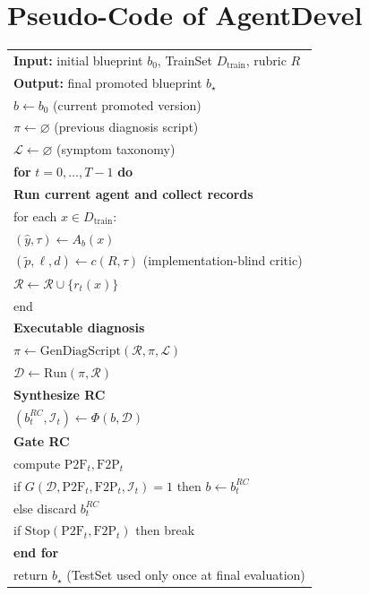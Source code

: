 \documentclass[11pt]{article}
\begin{document}
\clearpage
\onecolumn
\section{Pseudo-Code of AgentDevel}
\begin{tcolorbox}[enhanced, breakable, colback=white, colframe=black!60, title=Algorithm 1: AgentDevel (release-engineering improvement)]
\small
\begin{longtable}{@{}l@{}}

\textbf{Input:} initial blueprint $b_0$, TrainSet $D_{\text{train}}$, rubric $R$\\
\textbf{Output:} final promoted blueprint $b_\star$\\[4pt]

$b \leftarrow b_0$ \hfill (current promoted version)\\
$\pi \leftarrow \varnothing$ \hfill (previous diagnosis script)\\
$\mathcal{L} \leftarrow \varnothing$ \hfill (symptom taxonomy)\\[4pt]

\textbf{for} $t=0,\dots,T-1$ \textbf{do}\\
\quad \textbf{Run current agent and collect records}\\
\quad for each $x\in D_{\text{train}}$:\\
\quad\quad $(\hat y,\tau)\leftarrow A_b(x)$\\
\quad\quad $(\tilde p,\ell,d)\leftarrow c(R,\tau)$ \hfill (implementation-blind critic)\\
\quad\quad $\mathcal{R}\leftarrow \mathcal{R}\cup\{r_t(x)\}$\\
\quad end\\[2pt]

\quad \textbf{Executable diagnosis}\\
\quad $\pi \leftarrow \mathrm{GenDiagScript}(\mathcal{R},\pi,\mathcal{L})$\\
\quad $\mathcal{D}\leftarrow \mathrm{Run}(\pi,\mathcal{R})$\\[2pt]

\quad \textbf{Synthesize RC}\\
\quad $(b_t^{RC},\mathcal{I}_t)\leftarrow \Phi(b,\mathcal{D})$\\[2pt]

\quad \textbf{Gate RC}\\
\quad compute $\mathrm{P2F}_t,\mathrm{F2P}_t$\\
\quad if $G(\mathcal{D},\mathrm{P2F}_t,\mathrm{F2P}_t,\mathcal{I}_t)=1$ then $b\leftarrow b_t^{RC}$\\
\quad else discard $b_t^{RC}$\\[2pt]

\quad if $\mathrm{Stop}(\mathrm{P2F}_t,\mathrm{F2P}_t)$ then break\\
\textbf{end for}\\[4pt]

return $b_\star$ \hfill (TestSet used only once at final evaluation)\\

\end{longtable}
\end{tcolorbox}
\end{document}
